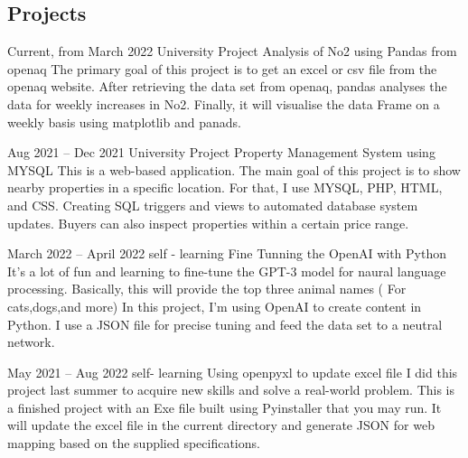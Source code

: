 \documentclass[
	10pt, %
]{FreemanCV}
\begin{document}
\begin{paracol}{2}
\section{Projects}





\jobentry
	{Current, from March 2022} %
	{University Project} %
	{} %
	{Analysis of No2 using Pandas from openaq } %
	{The primary goal of this project is to get an excel or csv file from the openaq website. After retrieving the data set from openaq, pandas analyses the data for weekly increases in No2. Finally, it will visualise the data Frame on a weekly basis using matplotlib and panads.} %


\jobentry
	{Aug 2021 -- Dec 2021} %
	{University Project} %
	{} %
	{Property Management System using MYSQL} %
	{This is a web-based application. The main goal of this project is to show nearby properties in a specific location. For that, I use MYSQL, PHP, HTML, and CSS. Creating SQL triggers and views to automated database system updates. Buyers can also inspect properties within a certain price range.} %



\jobentry
	{March 2022 -- April 2022} %
	{self - learning} %
	{} %
	{Fine Tunning the OpenAI with Python} %
	{It's a lot of fun and learning to fine-tune the GPT-3 model for naural language processing. Basically, this will provide the top three animal names ( For cats,dogs,and more)
In this project, I'm using OpenAI to create content in Python. I use a JSON file for precise tuning and feed the data set to a neutral network. } %

\jobentry
	{ May 2021 -- Aug 2022} %
	{self- learning} %
	{} %
	{Using openpyxl to update excel file} %
	{I did this project last summer to acquire new skills and solve a real-world problem. This is a finished project with an Exe file built using Pyinstaller that you may run. It will update the excel file in the current directory and generate JSON for web mapping based on the supplied specifications.} %


\end{paracol}
\end{document}
